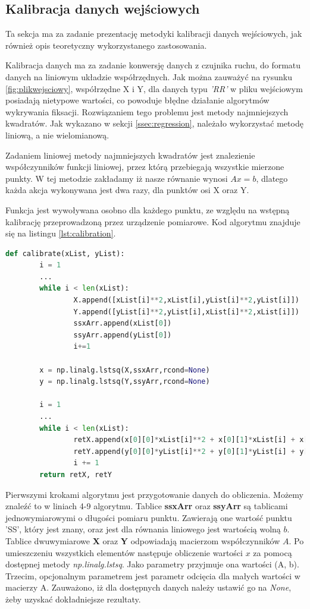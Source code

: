 \subsection{Kalibracja danych wejściowych}
Ta sekcja ma za zadanie prezentację metodyki kalibracji danych wejściowych, jak również opis teoretyczny wykorzystanego zastosowania.\par
Kalibracja danych ma za zadanie konwersję danych z czujnika ruchu, do formatu danych na liniowym układzie współrzędnych. Jak można zauważyć na rysunku \ref{fig:plikwejsciowy}, współrzędne X i Y, dla danych typu \emph{'RR'} w pliku wejściowym posiadają nietypowe wartości, co powoduje błędne działanie algorytmów wykrywania fiksacji. Rozwiązaniem tego problemu jest metody najmniejszych kwadratów. Jak wykazano w sekcji \ref{ssec:regression}, należało wykorzystać metodę liniową, a nie wielomianową.\par
Zadaniem liniowej metody najmniejszych kwadratów jest znalezienie współczynników funkcji liniowej, przez którą przebiegają wszystkie mierzone punkty. W tej metodzie zakładamy iż nasze równanie wynosi $Ax = b$, dlatego każda akcja wykonywana jest dwa razy, dla punktów osi X oraz Y.\par
Funkcja jest wywoływana osobno dla każdego punktu, ze względu na wstępną kalibrację przeprowadzoną przez urządzenie pomiarowe. Kod algorytmu znajduje się na listingu \ref{lst:calibration}.
\label{ssec:calibration}
\begin{lstlisting}[language=Python, caption=Algorytm kalibracji, label={lst:calibration}]
def calibrate(xList, yList):
        i = 1
        ...
        while i < len(xList):
                X.append([xList[i]**2,xList[i],yList[i]**2,yList[i]])
                Y.append([yList[i]**2,yList[i],xList[i]**2,xList[i]])
                ssxArr.append(xList[0])
                ssyArr.append(yList[0])
                i+=1
        
        x = np.linalg.lstsq(X,ssxArr,rcond=None)
        y = np.linalg.lstsq(Y,ssyArr,rcond=None)

        i = 1
        ...
        while i < len(xList):
                retX.append(x[0][0]*xList[i]**2 + x[0][1]*xList[i] + x[0][2]*yList[i]**2 + x[0][3]*yList[i])
                retY.append(y[0][0]*yList[i]**2 + y[0][1]*yList[i] + y[0][2]*xList[i]**2 + y[0][3]*xList[i])
                i += 1
        return retX, retY
\end{lstlisting}
Pierwszymi krokami algorytmu jest przygotowanie danych do obliczenia. Możemy znaleźć to w liniach 4-9 algorytmu. Tablice \textbf{ssxArr} oraz \textbf{ssyArr} są tablicami jednowymiarowymi o długości pomiaru punktu. Zawierają one wartość punktu 'SS', który jest znany, oraz jest dla równania liniowego jest wartością wolną $b$. Tablice dwuwymiarowe \textbf{X} oraz \textbf{Y} odpowiadają macierzom współczynników $A$. Po umieszczeniu wszystkich elementów następuje obliczenie wartości $x$ za pomocą dostępnej metody \emph{np.linalg.lstsq}. Jako parametry przyjmuje ona wartości (A, b). Trzecim, opcjonalnym parametrem jest parametr odcięcia dla małych wartości w macierzy A. Zauważono, iż dla dostępnych danych należy ustawić go na \emph{None}, żeby uzyskać dokładniejsze rezultaty.\par
